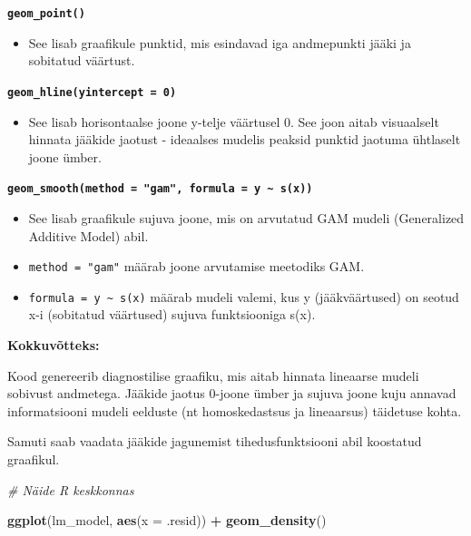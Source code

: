 \documentclass[
]{book}
\newenvironment{Shaded}{\begin{snugshade}}{\end{snugshade}}
\newcommand{\AttributeTok}[1]{\textcolor[rgb]{0.13,0.29,0.53}{#1}}
\newcommand{\CommentTok}[1]{\textcolor[rgb]{0.56,0.35,0.01}{\textit{#1}}}
\newcommand{\FunctionTok}[1]{\textcolor[rgb]{0.13,0.29,0.53}{\textbf{#1}}}
\newcommand{\NormalTok}[1]{#1}
\newcommand{\SpecialCharTok}[1]{\textcolor[rgb]{0.81,0.36,0.00}{\textbf{#1}}}
\providecommand{\tightlist}{%
  \setlength{\itemsep}{0pt}\setlength{\parskip}{0pt}}
\renewenvironment{Shaded} {\begin{snugshade}\footnotesize} {\end{snugshade}}
\begin{document}
\textbf{\texttt{geom\_point()}}

\begin{itemize}
\tightlist
\item
  See lisab graafikule punktid, mis esindavad iga andmepunkti jääki ja sobitatud väärtust.
\end{itemize}

\textbf{\texttt{geom\_hline(yintercept\ =\ 0)}}

\begin{itemize}
\tightlist
\item
  See lisab horisontaalse joone y-telje väärtusel 0. See joon aitab visuaalselt hinnata jääkide jaotust - ideaalses mudelis peaksid punktid jaotuma ühtlaselt joone ümber.
\end{itemize}

\textbf{\texttt{geom\_smooth(method\ =\ "gam",\ formula\ =\ y\ \textasciitilde{}\ s(x))}}

\begin{itemize}
\tightlist
\item
  See lisab graafikule sujuva joone, mis on arvutatud GAM mudeli (Generalized Additive Model) abil.
\item
  \texttt{method\ =\ "gam"} määrab joone arvutamise meetodiks GAM.
\item
  \texttt{formula\ =\ y\ \textasciitilde{}\ s(x)} määrab mudeli valemi, kus y (jääkväärtused) on seotud x-i (sobitatud väärtused) sujuva funktsiooniga s(x).
\end{itemize}

\textbf{Kokkuvõtteks:}

Kood genereerib diagnostilise graafiku, mis aitab hinnata lineaarse mudeli sobivust andmetega. Jääkide jaotus 0-joone ümber ja sujuva joone kuju annavad informatsiooni mudeli eelduste (nt homoskedastsus ja lineaarsus) täidetuse kohta.

Samuti saab vaadata jääkide jagunemist tihedusfunktsiooni abil koostatud graafikul.

\begin{Shaded}
\begin{Highlighting}[]
\CommentTok{\# Näide R keskkonnas}

\FunctionTok{ggplot}\NormalTok{(lm\_model, }\FunctionTok{aes}\NormalTok{(}\AttributeTok{x =}\NormalTok{ .resid)) }\SpecialCharTok{+}
  \FunctionTok{geom\_density}\NormalTok{()}
\end{Highlighting}
\end{Shaded}
\end{document}

